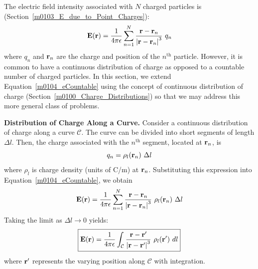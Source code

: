 

\label{m0104_E_due_to_a_Continuous_Distribution_of_Charge} %

The electric field intensity associated with $N$ charged particles is (Section~\ref{m0103_E_due_to_Point_Charges}):
%
\begin{equation}
{\bf E}({\bf r}) = \frac{1}{4\pi\epsilon} \sum_{n=1}^{N} {   \frac{{\bf r}-{\bf r}_n}{\left|{\bf r}-{\bf r}_n\right|^3}~q_n}
\label{m0104_eCountable}
\end{equation}
%
where $q_n$ and ${\bf r}_n$ are the charge and position of the $n^{\mbox{th}}$ particle.
However, it is common to have a continuous distribution of charge as opposed to a countable number of charged particles.
In this section, we extend Equation~\ref{m0104_eCountable} using the concept of continuous distribution of charge (Section~\ref{m0100_Charge_Distributions}) so that we may address this more general class of problems.


{\bf Distribution of Charge Along a Curve.}
Consider a continuous distribution of charge along a curve $\mathcal{C}$.
The curve can be divided into short segments of length $\Delta l$.  
Then, the charge associated with the $n^{\mbox{th}}$ segment, located at ${\bf r}_n$, is
%
\begin{equation}
q_n = \rho_l({\bf r}_n)~\Delta l
\end{equation}
%
where $\rho_l$ is charge density (units of C/m) at ${\bf r}_n$.
Substituting this expression into Equation~\ref{m0104_eCountable}, we obtain
%
\begin{equation}
{\bf E}({\bf r}) = \frac{1}{4\pi\epsilon} \sum_{n=1}^{N} {   \frac{{\bf r}-{\bf r}_n}{\left|{\bf r}-{\bf r}_n\right|^3}~\rho_l({\bf r}_n)~\Delta l}
\end{equation}
%
Taking the limit as $\Delta l\to 0$ yields:
%
\begin{equation}
\boxed{
{\bf E}({\bf r}) = \frac{1}{4\pi\epsilon} \int_{\mathcal C} {   \frac{{\bf r}-{\bf r}'}{\left|{\bf r}-{\bf r}'\right|^3}~\rho_l({\bf r}')~dl}
}
\label{m0104_eLineCharge}
\end{equation}
%
where ${\bf r}'$ represents the varying position along ${\mathcal C}$ with integration.

